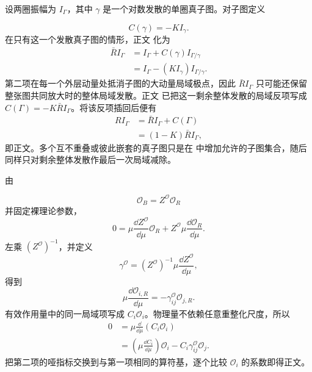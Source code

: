 
\begin{derivation}
设两圈振幅为 $I_\Gamma$，其中 $\gamma$ 是一个对数发散的单圈真子图。对子图定义

\begin{equation*}
 C(\gamma)=-K I_\gamma.
\end{equation*}
在只有这一个发散真子图的情形，正文 化为
\begin{align*}
 \bar R I_\Gamma
 &=I_\Gamma+C(\gamma)I_{\Gamma/\gamma}\\
 &=I_\Gamma-(K I_\gamma)I_{\Gamma/\gamma}.
\end{align*}
第二项在每一个外层动量处抵消子图的大动量局域极点，因此 $\bar R I_\Gamma$ 只可能还保留整张图共同放大时的整体局域发散。正文 已把这一剩余整体发散的局域反项写成 $C(\Gamma)=-K\bar R I_\Gamma$。将该反项插回后便有
\begin{align*}
 R I_\Gamma
 &=\bar R I_\Gamma+C(\Gamma)\\
 &=(1-K)\bar R I_\Gamma,
\end{align*}
即正文。多个互不重叠或彼此嵌套的真子图只是在 中增加允许的子图集合，随后同样只对剩余整体发散作最后一次局域减除。
\end{derivation}

\begin{derivation}
由

\begin{equation*}
 \mathcal O_B=Z^{\mathcal O}\mathcal O_R
\end{equation*}
并固定裸理论参数，
\begin{equation*}
 0=\mu\frac{\dd Z^{\mathcal O}}{\dd\mu}\mathcal O_R
 +Z^{\mathcal O}\mu\frac{\dd\mathcal O_R}{\dd\mu}.
\end{equation*}
左乘 $(Z^{\mathcal O})^{-1}$，并定义
\begin{equation*}
 \gamma^{\mathcal O}
 =(Z^{\mathcal O})^{-1}\mu\frac{\dd Z^{\mathcal O}}{\dd\mu},
\end{equation*}
得到
\begin{equation*}
 \mu\frac{\dd\mathcal O_{i,R}}{\dd\mu}
 =-\gamma_{ij}^{\mathcal O}\mathcal O_{j,R}.
\end{equation*}
有效作用量中的同一局域项写成 $C_i\mathcal O_i$。物理量不依赖任意重整化尺度，所以
\begin{align*}
 0
 &=\mu\frac{\dd}{\dd\mu}(C_i\mathcal O_i)\\
 &=\left(\mu\frac{\dd C_i}{\dd\mu}\right)\mathcal O_i
 -C_i\gamma_{ij}^{\mathcal O}\mathcal O_j.
\end{align*}
把第二项的哑指标交换到与第一项相同的算符基，逐个比较 $\mathcal O_i$ 的系数即得正文。
\end{derivation}

